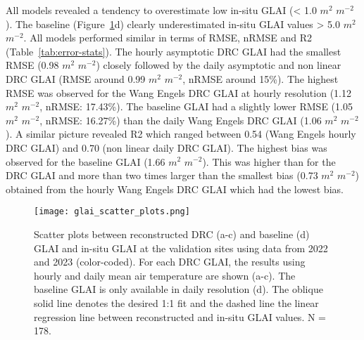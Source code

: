 All models revealed a tendency to overestimate low in-situ \gls{GLAI} (< 1.0 $m^2$ $m^{-2}$). The baseline (Figure~\ref{fig:glai-scatter-plots}d) clearly underestimated in-situ \gls{GLAI} values > 5.0 $m^2$ $m^{-2}$. All models performed similar in terms of \gls{RMSE}, \gls{nRMSE} and \gls{R2} (Table~\ref{tab:error-stats}). The hourly asymptotic \gls{DRC} \gls{GLAI} had the smallest \gls{RMSE} (0.98 $m^2$ $m^{-2}$) closely followed by the daily asymptotic and non linear \gls{DRC} \gls{GLAI} (\gls{RMSE} around 0.99  $m^2$ $m^{-2}$, \gls{nRMSE} around 15\%). The highest \gls{RMSE} was observed for the Wang Engels \gls{DRC} \gls{GLAI} at hourly resolution (1.12  $m^2$ $m^{-2}$, \gls{nRMSE}: 17.43\%). The baseline \gls{GLAI} had a slightly lower \gls{RMSE} (1.05  $m^2$ $m^{-2}$, \gls{nRMSE}: 16.27\%) than the daily Wang Engels \gls{DRC} \gls{GLAI} (1.06  $m^2$ $m^{-2}$). A similar picture revealed \gls{R2} which ranged between 0.54 (Wang Engels hourly \gls{DRC} \gls{GLAI}) and 0.70 (non linear daily \gls{DRC} \gls{GLAI}). The highest bias was observed for the baseline \gls{GLAI} (1.66  $m^2$ $m^{-2}$). This was higher than for the \gls{DRC} \gls{GLAI} and more than two times larger than the smallest bias (0.73  $m^2$ $m^{-2}$) obtained from the hourly Wang Engels \gls{DRC} \gls{GLAI} which had the lowest bias.

\begin{figure}[H]
    \centering
    \texttt{[image: glai\_scatter\_plots.png]}
    \caption{Scatter plots between reconstructed \gls{DRC} (a-c) and baseline (d) \gls{GLAI} and in-situ \gls{GLAI} at the validation sites using data from 2022 and 2023 (color-coded). For each \gls{DRC} \gls{GLAI}, the results using hourly and daily mean air temperature are shown (a-c). The baseline \gls{GLAI} is only available in daily resolution (d). The oblique solid line denotes the desired 1:1 fit and the dashed line the linear regression line between reconstructed and in-situ \gls{GLAI} values. N = 178.}
    \label{fig:glai-scatter-plots}
\end{figure}

